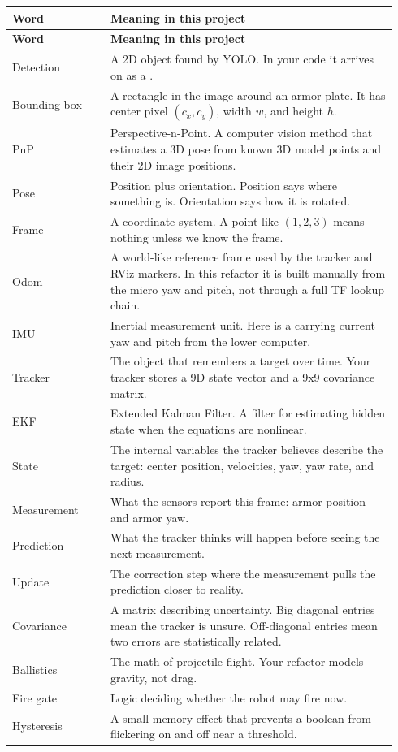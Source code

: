 \documentclass[11pt,a4paper]{article}
\newcommand{\code}[1]{\ifmmode\text{\ttfamily\detokenize{#1}}\else\texttt{\detokenize{#1}}\fi}
\begin{document}
\begin{longtable}{p{0.24\linewidth} p{0.70\linewidth}}
\toprule
\textbf{Word} & \textbf{Meaning in this project} \\
\midrule
\endfirsthead
\toprule
\textbf{Word} & \textbf{Meaning in this project} \\
\midrule
\endhead
Detection & A 2D object found by YOLO. In your code it arrives on \code{/detector/armors} as a \code{vision_msgs::msg::Detection2DArray}. \\
Bounding box & A rectangle in the image around an armor plate. It has center pixel \((c_x,c_y)\), width \(w\), and height \(h\). \\
PnP & Perspective-n-Point. A computer vision method that estimates a 3D pose from known 3D model points and their 2D image positions. \\
Pose & Position plus orientation. Position says where something is. Orientation says how it is rotated. \\
Frame & A coordinate system. A point like \((1,2,3)\) means nothing unless we know the frame. \\
Odom & A world-like reference frame used by the tracker and RViz markers. In this refactor it is built manually from the micro yaw and pitch, not through a full TF lookup chain. \\
IMU & Inertial measurement unit. Here \code{/micro_imu} is a \code{Float32MultiArray} carrying current yaw and pitch from the lower computer. \\
Tracker & The object that remembers a target over time. Your tracker stores a 9D state vector and a 9x9 covariance matrix. \\
EKF & Extended Kalman Filter. A filter for estimating hidden state when the equations are nonlinear. \\
State & The internal variables the tracker believes describe the target: center position, velocities, yaw, yaw rate, and radius. \\
Measurement & What the sensors report this frame: armor position and armor yaw. \\
Prediction & What the tracker thinks will happen before seeing the next measurement. \\
Update & The correction step where the measurement pulls the prediction closer to reality. \\
Covariance & A matrix describing uncertainty. Big diagonal entries mean the tracker is unsure. Off-diagonal entries mean two errors are statistically related. \\
Ballistics & The math of projectile flight. Your refactor models gravity, not drag. \\
Fire gate & Logic deciding whether the robot may fire now. \\
Hysteresis & A small memory effect that prevents a boolean from flickering on and off near a threshold. \\
\bottomrule
\end{longtable}
\end{document}
